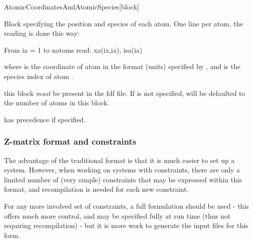\begin{fdfentry}{AtomicCoordinatesAndAtomicSpecies}[block]

  Block specifying the position and species of each atom.  One line
  per atom, the reading is done this way:
  \begin{shellexample}
       From ia = 1 to natoms
            read: xa(ix,ia), isa(ia)
  \end{shellexample}
  where  is the  coordinate of atom
   in the format (units) specified by
  , and  is the species
  index of atom .

  \note this block \emph{must} be present in the fdf file. If
   is not specified,  will be
  defaulted to the number of atoms in this block.

  \note {} has precedence if specified.
  
\end{fdfentry}


\subsubsection{Z-matrix format and constraints}
\label{sec:Zmatrix}

The advantage of the traditional format is that it is
much easier to set up a system. However, when working
on systems with constraints, there are only a limited
number of (very simple) constraints that may be expressed
within this format, and recompilation is needed for each
new constraint.

For any more involved set of constraints, a
full  formulation should be used - this
offers much more control, and may be specified fully at
run time (thus not requiring recompilation) - but
it is more work to generate the input files for this form.



